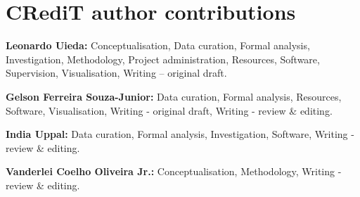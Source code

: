 \section*{CRediT author contributions}

\textbf{Leonardo Uieda:} Conceptualisation, Data curation, Formal analysis,
Investigation, Methodology, Pro\-ject administration, Resources, Software,
Supervision, Visualisation, Writing – original draft.

\noindent
\textbf{Gelson Ferreira Souza-Junior:} Data curation, Formal analysis,
Resources, Software, Visualisation, Writing - original draft, Writing - review
\& editing.

\noindent
\textbf{India Uppal:} Data curation, Formal analysis, Investigation, Software,
Writing - review \& editing.

\noindent
\textbf{Vanderlei Coelho Oliveira Jr.:} Conceptualisation, Methodology, Writing
- review \& editing.
